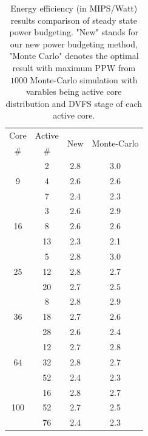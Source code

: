 \begin{table}
  \caption{Energy efficiency (in MIPS/Watt) results comparison of steady state power budgeting. "New" stands for our new power budgeting method, "Monte Carlo" denotes the optimal result with maximum PPW from $1000$ Monte-Carlo simulation with varables being active core distribution and DVFS stage of each active core.}
  \label{tab:PPW_steady}
  \centering
  \begin{tabular}{c|c||c|c}
    \hline
    Core & Active     & \multirow {2}{*}{New} &
                                                    \multirow {2}{*}{Monte-Carlo }\\

\#       &   \#       & &   \\
     \hline
\hline
  \multirow{3}{*}{9} &      2     &       2.8       & 3.0   \\ 
             &      4             &      2.6     &  2.6  \\
             &      7             &       2.4     &  2.3  \\
     \hline
\multirow{3}{*}{16}   &      3    &      2.6     &   2.9 \\   
             &      8             &      2.6    &   2.6  \\
             &      13            &      2.3     &   2.1\\
     \hline
 \multirow{3}{*}{25}  &      5    &     2.8    &   3.0     \\ 
                &     12          &     2.8   &   2.7    \\
                &     20          &     2.7    &   2.5    \\
     \hline
  \multirow{3}{*}{36}  &     8            &      2.8    &  2.9     \\
              &     18            &     2.7          &  2.6   \\
              &     28          &        2.6         &  2.4  \\
     \hline
 \multirow{3}{*}{64}   &     12           &     2.7  &   2.8    \\
              &     32      &      2.8           &   2.7    \\
              &     52        &      2.4          &   2.3     \\
              
 \hline 
 \multirow{3}{*}{100} & 16 & 2.8  &   2.7   \\
                      & 52 & 2.7  &   2.5  \\
                      & 76 & 2.4  &  2.3   \\
\hline
  
\end{tabular}
\end{table}



